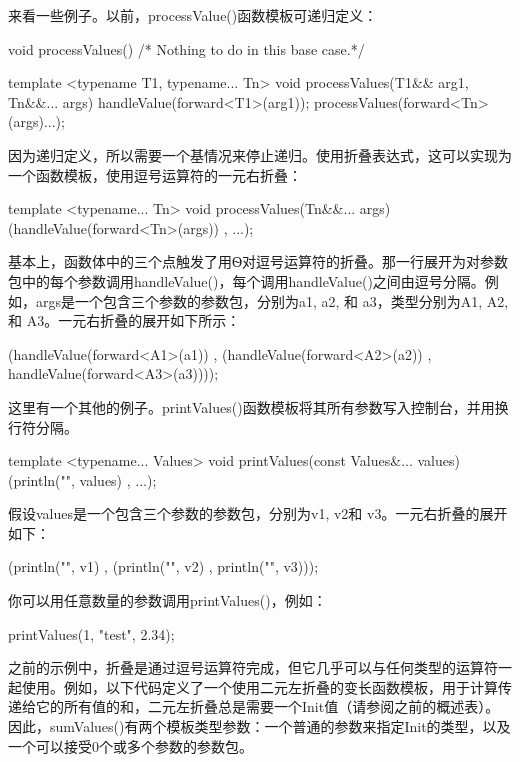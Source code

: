 来看一些例子。以前，processValue()函数模板可递归定义：

\begin{cpp}
void processValues() { /* Nothing to do in this base case.*/ }

template <typename T1, typename... Tn>
void processValues(T1&& arg1, Tn&&... args)
{
    handleValue(forward<T1>(arg1));
    processValues(forward<Tn>(args)...);
}
\end{cpp}

因为递归定义，所以需要一个基情况来停止递归。使用折叠表达式，这可以实现为一个函数模板，使用逗号运算符的一元右折叠：

\begin{cpp}
template <typename... Tn>
void processValues(Tn&&... args) { (handleValue(forward<Tn>(args)) , ...); }
\end{cpp}

基本上，函数体中的三个点触发了用Ѳ对逗号运算符的折叠。那一行展开为对参数包中的每个参数调用handleValue()，每个调用handleValue()之间由逗号分隔。例如，args是一个包含三个参数的参数包，分别为a1, a2, 和 a3，类型分别为A1, A2, 和 A3。一元右折叠的展开如下所示：

\begin{cpp}
(handleValue(forward<A1>(a1)) ,
    (handleValue(forward<A2>(a2)) , handleValue(forward<A3>(a3))));
\end{cpp}

这里有一个其他的例子。printValues()函数模板将其所有参数写入控制台，并用换行符分隔。

\begin{cpp}
template <typename... Values>
void printValues(const Values&... values) { (println("{}", values) , ...); }
\end{cpp}

假设values是一个包含三个参数的参数包，分别为v1, v2和 v3。一元右折叠的展开如下：

\begin{cpp}
(println("{}", v1) , (println("{}", v2) , println("{}", v3)));
\end{cpp}

你可以用任意数量的参数调用printValues()，例如：

\begin{cpp}
printValues(1, "test", 2.34);
\end{cpp}

之前的示例中，折叠是通过逗号运算符完成，但它几乎可以与任何类型的运算符一起使用。例如，以下代码定义了一个使用二元左折叠的变长函数模板，用于计算传递给它的所有值的和，二元左折叠总是需要一个Init值（请参阅之前的概述表）。因此，sumValues()有两个模板类型参数：一个普通的参数来指定Init的类型，以及一个可以接受0个或多个参数的参数包。

